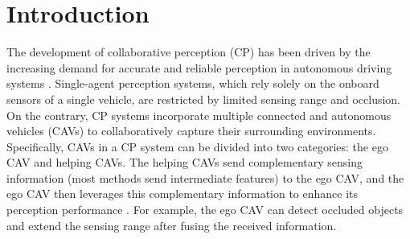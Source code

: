 
\vspace{-10mm}
\section{Introduction}
\label{sec:intro}




 


The development of collaborative perception (CP) has been driven by the increasing demand for accurate and reliable perception in autonomous driving systems \citep{chenCooperCooperativePerception2019,chenFcooperFeatureBased2019,liV2XSimMultiAgentCollaborative2022,huWhere2commCommunicationefficientCollaborative2024,huAdaptiveCommunicationsCollaborative2023,huFullSceneDomainGeneralization2024,fangPACPPriorityAwareCollaborative2024,xuOPV2VOpenBenchmark2022,huAgentsCoMergeLargeLanguage2024, hu2024cpguardmaliciousagentdetection, huCollaborativePerceptionConnected2024,tao2025gcpguardedcollaborativeperception,lin2024split,lin2024splitlora}. Single-agent perception systems, which rely solely on the onboard sensors of a single vehicle, are restricted by limited sensing range and occlusion. On the contrary, CP systems incorporate multiple connected and autonomous vehicles (CAVs) to collaboratively capture their surrounding environments. Specifically, CAVs in a CP system can be divided into two categories: the ego CAV and helping CAVs. The helping CAVs send complementary sensing information (most methods send intermediate features) to the ego CAV, and the ego CAV then leverages this complementary information to enhance its perception performance \citep{balkusSurveyCollaborativeMachine2022,hanCollaborativePerceptionAutonomous2023,huAgentsCoDriverLargeLanguage2024,wangV2VNetVehicletoVehicleCommunication2020a,10845862,fang2024pibprioritizedinformationbottleneck, tao2024directcpdirectedcollaborativeperception,fang2024ic3mincarmultimodalmultiobject,lin2024efficient,lin2024fedsn,lin2024adaptsfl}. For example, the ego CAV can detect occluded objects and extend the sensing range after fusing the received information.


